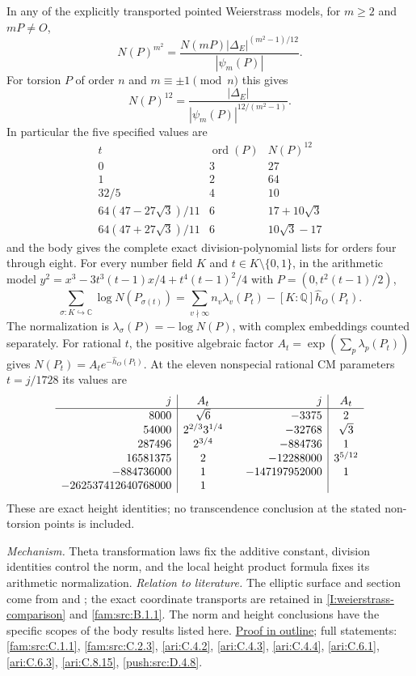 \documentclass[11pt,a4paper]{article}
\theoremstyle{definition}
\newcommand{\C}{\mathbb C}\newcommand{\R}{\mathbb R}\newcommand{\Z}{\mathbb Z}\newcommand{\Q}{\mathbb Q}\newcommand{\N}{\mathbb N}\newcommand{\F}{\mathbb F}
\begin{document}
In any of the explicitly transported pointed Weierstrass models,
for $m\ge2$ and $mP\ne O$,
\[
 N(P)^{m^2}=\frac{N(mP)|\Delta_E|^{(m^2-1)/12}}{|\psi_m(P)|}.
\]
For torsion $P$ of order $n$ and $m\equiv\pm1\pmod n$ this gives
\[
 N(P)^{12}=\frac{|\Delta_E|}{|\psi_m(P)|^{12/(m^2-1)}}.
\]
In particular the five specified values are
\[
\begin{array}{c|c|c}
t&\operatorname{ord}(P)&N(P)^{12}\\\hline
0&3&27\\1&2&64\\32/5&4&10\\
64(47-27\sqrt3)/11&6&17+10\sqrt3\\
64(47+27\sqrt3)/11&6&10\sqrt3-17
\end{array}
\]
and the body gives the complete exact division-polynomial lists
for orders four through eight.  For every number field $K$ and
$t\in K\setminus\{0,1\}$, in the arithmetic model
$y^2=x^3-3t^3(t-1)x/4+t^4(t-1)^2/4$ with
$P=(0,t^2(t-1)/2)$,
\[
 \sum_{\sigma:K\hookrightarrow\C}\log N(P_{\sigma(t)})
 =\sum_{v\nmid\infty}n_v\lambda_v(P_t)
       -[K:\Q]\widehat h_O(P_t).
\]
The normalization is $\lambda_\sigma(P)=-\log N(P)$, with complex
embeddings counted separately.  For rational $t$, the positive
algebraic factor $A_t=\exp(\sum_p\lambda_p(P_t))$ gives
$N(P_t)=A_t e^{-\widehat h_O(P_t)}$.  At the eleven nonspecial
rational CM parameters $t=j/1728$ its values are
\[
\begin{array}{r|c@{\qquad}r|c}
j&A_t&j&A_t\\\hline
8000&\sqrt6&-3375&2\\
54000&2^{2/3}3^{1/4}&-32768&\sqrt3\\
287496&2^{3/4}&-884736&1\\
16581375&2&-12288000&3^{5/12}\\
-884736000&1&-147197952000&1\\
-262537412640768000&1&&
\end{array}
\]
These are exact height identities; no transcendence conclusion
at the stated non-torsion points is included.

\textit{Mechanism.} Theta transformation laws fix the additive
constant, division identities control the norm, and the local
height product formula fixes its arithmetic normalization.
\textit{Relation to literature.} The elliptic surface and section
come from \cite[Remark~3.12, p.~19]{AC2026} and
\cite[Definition~2.3]{Engel2026}; the exact coordinate transports
are retained in \ref{I:weierstrass-comparison} and
\ref{fam:src:B.1.1}.  The norm and height conclusions have the
specific scopes of the body results listed here.
\hyperlink{outline-I-A}{Proof in outline}; full statements:
\ref{fam:src:C.1.1}, \ref{fam:src:C.2.3},
\ref{ari:C.4.2}, \ref{ari:C.4.3}, \ref{ari:C.4.4},
\ref{ari:C.6.1}, \ref{ari:C.6.3}, \ref{ari:C.8.15},
\ref{push:src:D.4.8}.
\end{document}
